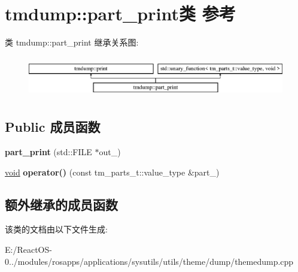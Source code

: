 \hypertarget{classtmdump_1_1part__print}{}\section{tmdump\+:\+:part\+\_\+print类 参考}
\label{classtmdump_1_1part__print}
类 tmdump\+:\+:part\+\_\+print 继承关系图\+:\begin{figure}[H]
\begin{center}
\leavevmode
\includegraphics[height=1.812298cm]{classtmdump_1_1part__print}
\end{center}
\end{figure}
\subsection*{Public 成员函数}
\begin{DoxyCompactItemize}
\item 
\mbox{\label{classtmdump_1_1part__print_a37e067c14abeb3fabf662cb1a6d6446d}} 
{\bfseries part\+\_\+print} (std\+::\+F\+I\+LE $\ast$out\+\_\+)
\item 
\mbox{\label{classtmdump_1_1part__print_ab4f36110fd075f699f2d3b209bd4e7d2}} 
\hyperlink{interfacevoid}{void} {\bfseries operator()} (const tm\+\_\+parts\+\_\+t\+::value\+\_\+type \&part\+\_\+)
\end{DoxyCompactItemize}
\subsection*{额外继承的成员函数}


该类的文档由以下文件生成\+:\begin{DoxyCompactItemize}
\item 
E\+:/\+React\+O\+S-\/0../modules/rosapps/applications/sysutils/utils/theme/dump/themedump.\+cpp\end{DoxyCompactItemize}
